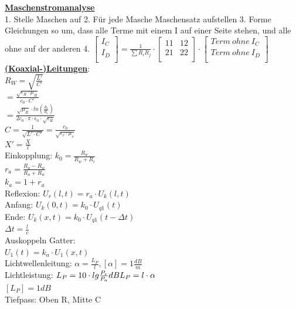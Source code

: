 \documentclass[11pt]{article}
\begin{document}
\begin{minipage}{0.3\textwidth}

\underline{\textbf{Maschenstromanalyse}}\\
1. Stelle Maschen auf
2. Für jede Masche Maschensatz aufstellen
3. Forme Gleichungen so um, dass alle Terme mit einem I auf einer Seite stehen, und alle ohne auf der anderen
4. $\begin{bmatrix}
	I_C\\
	I_D\\
\end{bmatrix} = \frac{1}{\sum R_iR_j} \cdot \begin{bmatrix}
	11 & 12\\ %
	21 & 22\\
\end{bmatrix} \cdot \begin{bmatrix}
	Term~ohne~I_C\\
	Term~ohne~I_D\\
\end{bmatrix} 
 $\\
 
 \underline{\textbf{(Koaxial-)Leitungen}}:\\
$R_W = \sqrt{\frac{L'}{C'}}$\\
    \phantom{sssi} $=\frac{\sqrt{\epsilon_R \cdot \mu_R}}{c_0 \cdot C'}$\\
    \phantom{sssi} $=\frac{\sqrt{\mu_R} \cdot ln(\frac{d_a}{d_i})}{2c_0 \cdot \pi \cdot \epsilon_0 \cdot \sqrt{\epsilon_R}}$\\
$C = \frac{1}{\sqrt{L' \cdot C'}} = \frac{c_0}{\sqrt{\epsilon_r \cdot \mu_s}}$\\
$X' = \frac{X}{l}$\\


Einkopplung: $k_0 = \frac{R_w}{R_w + R_i} $\\
$r_a = \frac{R_a - R_w}{R_a + R_w} $\\
$k_a = 1 + r_a$\\
Reflexion: $U_r(l,t) = r_a \cdot U_k(l,t)$\\
Anfang: $U_k(0,t)=k_0 \cdot U_{q1}(t)$\\
Ende: $U_k(x,t)= k_0 \cdot U_{q1}(t-\Delta t)$\\
$\Delta t = \frac{l}{c}$\\
Auskoppeln Gatter:\\
\phantom{ss} $U_1(t) = k_a \cdot U_1(x,t)$\\
Lichtwellenleitung: $\alpha = \frac{L_P}{l}, [\alpha] = 1 \frac{dB}{m}$\\
Lichtleistung: $L_P = 10 \cdot lg\frac{P_e}{P_a} dB\\ L_P = l \cdot \alpha$\\
$ [L_P] = 1dB$\\
Tiefpass: Oben R, Mitte C





\end{minipage}%
\end{document}
